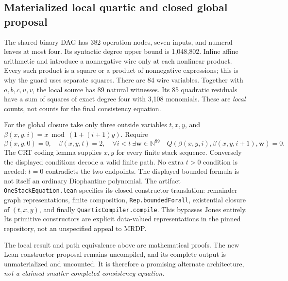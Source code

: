 \subsection{Materialized local quartic and closed global proposal}
The shared binary DAG has 382 operation nodes, seven inputs, and numeral
leaves at most four. Its syntactic degree upper bound is 1,048,802.
Inline affine arithmetic and introduce a nonnegative wire only at each
nonlinear product. Every such product is a square or a product of
nonnegative expressions; this is why the guard uses separate squares.
There are 84 wire variables. Together with $a,b,c,u,v$, the local source
has 89 natural witnesses. Its 85 quadratic residuals have a sum of squares
of exact degree four with 3,108 monomials. These are \emph{local} counts,
not counts for the final consistency equation.

For the global closure take only three outside variables $t,x,y$, and
$\beta(x,y,i)=x\bmod(1+(i+1)y)$. Require
\[
 \beta(x,y,0)=0,\quad \beta(x,y,t)=2,\quad
 \forall i<t\ \exists\mathbf w\in\mathbb N^{89}\quad
 Q(\beta(x,y,i),\beta(x,y,i+1),\mathbf w)=0.
\]
The CRT coding lemma supplies $x,y$ for every finite stack sequence.
Conversely the displayed conditions decode a valid finite path.
No extra $t>0$ condition is needed: $t=0$ contradicts the two endpoints.
The displayed bounded formula is not itself an ordinary Diophantine
polynomial. The artifact \texttt{OneStackEquation.lean} specifies its
closed constructor translation: remainder graph representations, finite
composition, \texttt{Rep.boundedForall}, existential closure of $(t,x,y)$,
and finally \texttt{QuarticCompiler.compile}. This bypasses Jones entirely.
Its primitive constructors are explicit data-valued representations in the
pinned repository, not an unspecified appeal to MRDP.

The local result and path equivalence above are mathematical proofs. The
new Lean constructor proposal remains uncompiled, and its complete output
is unmaterialized and uncounted. It is therefore a promising alternate
architecture, \emph{not a claimed smaller completed consistency equation}.
